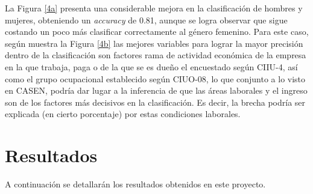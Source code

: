 La Figura \ref{4a} presenta una considerable mejora en la clasificación de hombres y mujeres, obteniendo un \textit{accuracy} de 0.81, aunque se logra observar que sigue costando un poco más clasificar correctamente al género femenino. Para este caso, según muestra la Figura \ref{4b} las mejores variables para lograr la mayor precisión dentro de la clasificación son factores rama de actividad económica de la empresa en la que trabaja, paga o de la que se es dueño el encuestado según CIIU-4, así como el grupo ocupacional establecido según CIUO-08, lo que conjunto a lo visto en CASEN, podría dar lugar a la inferencia de que las áreas laborales y el ingreso son de los factores más decisivos en la clasificación. Es decir, la brecha podría ser explicada (en cierto porcentaje) por estas condiciones laborales.

\section{Resultados}

A continuación se detallarán los resultados obtenidos en este proyecto. 

\FloatBarrier

